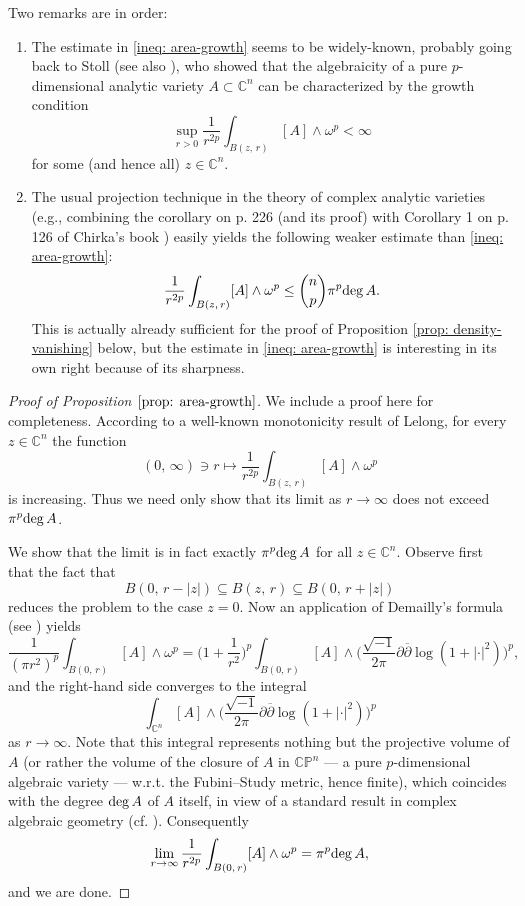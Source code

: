 \documentclass[12pt,a4paper]{amsart}
\numberwithin{equation}{section}
\theoremstyle{definition}
\begin{document}
Two remarks are in order:
\begin{enumerate}[leftmargin=1.6pc, parsep=2pt]
  \item [{\rm(i)}]  The estimate in \eqref{ineq: area-growth} seems to be widely-known, probably going back to Stoll \cite{Stoll_algebraicity} (see also \cite[Section 17.2]{Chirka_CAbook}), who showed that the algebraicity of a pure $p$-dimensional analytic variety $A\subset\mathbb C^n$ can be characterized by the growth condition
        $$
        \sup_{r>0}\frac{1}{r^{2p}} \int_{B(z, \,r)} [A]\wedge \omega^p < \infty
        $$
      for some (and hence all) $z\in\mathbb C^n$.


  \item [{\rm(ii)}] The usual projection technique in the theory of complex analytic varieties (e.g., combining the corollary on p. 226 (and its proof) with Corollary 1 on p. 126 of Chirka's book \cite{Chirka_CAbook}) easily yields the following weaker estimate than \eqref{ineq: area-growth}:
       $$
       \frac{1}{r^{2p}} \int_{B(z, \,r)} [A]\wedge \omega^p \leq \binom{n}{p}\pi^p {\rm deg}\,A.
       $$
       This is actually already sufficient for the proof of Proposition \ref{prop: density-vanishing} below, but the estimate in \eqref{ineq: area-growth} is interesting in its own right because of its sharpness.

\end{enumerate}

\begin{proof}[Proof of Proposition $\ref{prop: area-growth}$]
We include a proof here for completeness. According to a well-known monotonicity result of Lelong, for every $z\in\mathbb C^n$ the function
  $$
  (0,\, \infty)\ni r \mapsto \frac{1}{r^{2p}} \int_{B(z, \,r)} [A]\wedge \omega^p
  $$
is increasing. Thus we need only show that its limit as $r\to\infty$ does not exceed $\pi^p {\rm deg}\,A$.

We show that the limit is in fact exactly $\pi^p {\rm deg}\,A$ for all $z\in\mathbb C^n$. Observe first that the fact that
  $$
  B(0, \,r-|z|)\subseteq B(z, \,r) \subseteq B(0, \,r+|z|)
  $$
reduces the problem to the case $z=0$. Now an application of Demailly's formula (see \cite[Chapter III, Formula 5.5]{Demaillybook}) yields
  $$
  \frac{1}{(\pi r^2)^p} \int_{B(0, \,r)} [A]\wedge \omega^p
  =\bigg(1+\frac{1}{r^2}\bigg)^p \int_{B(0, \,r)} [A]\wedge
   \bigg(\frac{\sqrt{-1}}{2\pi}\partial\overline{\partial}\log(1+|\cdot|^2)\bigg)^p,
  $$
and the right-hand side converges to the integral
  $$
  \int_{\mathbb C^n} [A]\wedge \bigg(\frac{\sqrt{-1}}{2\pi}\partial\overline{\partial}\log(1+|\cdot|^2)\bigg)^p
  $$
as $r\to\infty$. Note that this integral represents nothing but the projective volume of $A$ (or rather the volume of the closure of $A$ in $\mathbb{CP}^n$ --- a pure $p$-dimensional algebraic variety --- w.r.t. the Fubini--Study metric, hence finite), which coincides with the degree ${\rm deg}\,A$ of $A$ itself, in view of a standard result in complex algebraic geometry (cf. \cite[Section 14.7]{Chirka_CAbook}).
Consequently
  $$
  \lim_{r\to\infty} \frac{1}{r^{2p}} \int_{B(0, \,r)} [A]\wedge\omega^p = \pi^p {\rm deg}\,A,
  $$
and we are done.
\end{proof}
\end{document}
